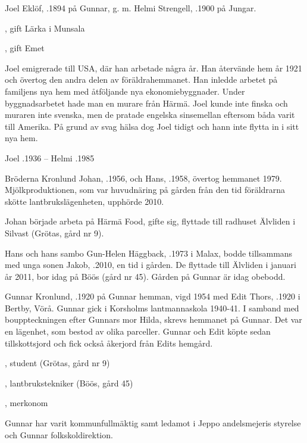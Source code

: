 Joel Eklöf, .1894 på Gunnar, g. m. Helmi Strengell, .1900 på Jungar.
\begin{jhchildren}
  \item {}, gift Lärka i Munsala
  \item {}
  \item {}, gift Emet
\end{jhchildren}
Joel emigrerade till USA, där han arbetade några år. Han återvände hem år 1921 och övertog den andra delen av föräldrahemmanet. Han inledde arbetet på familjens nya hem med åtföljande nya ekonomiebyggnader. Under byggnadsarbetet hade man en murare från Härmä. Joel kunde inte finska och muraren inte svenska, men de pratade engelska sinsemellan eftersom båda varit till Amerika. På grund av svag hälsa dog Joel tidigt och hann inte flytta in i sitt nya hem.

Joel .1936  --  Helmi .1985




Bröderna Kronlund Johan, .1956, och Hans, .1958, övertog hemmanet 1979. Mjölkproduktionen, som var huvudnäring på gården från den tid föräldrarna skötte lantbrukslägenheten, upphörde 2010.

Johan började arbeta på Härmä Food, gifte sig, flyttade till radhuset Älvliden i Silvast (Grötas, gård nr 9).


Hans och hans sambo Gun-Helen Häggback, .1973 i Malax, bodde tillsammans med unga sonen Jakob, .2010, en tid i gården. De flyttade till Älvliden i januari år 2011, bor idag på Böös (gård nr 45). Gården på Gunnar är idag obebodd.


Gunnar Kronlund, .1920 på Gunnar hemman, vigd 1954 med Edit Thors, .1920 i Bertby, Vörå. Gunnar gick i Korsholms lantmannaskola 1940-41. I samband med bouppteckningen efter Gunnars mor Hilda, skrevs hemmanet på Gunnar. Det var en lägenhet, som bestod av olika parceller. Gunnar och Edit köpte sedan tillskottsjord och fick också åkerjord från Edits hemgård.
\begin{jhchildren}
  \item {}, student (Grötas, gård nr 9)
  \item {}, lantbrukstekniker (Böös, gård 45)
  \item {}, merkonom
\end{jhchildren}
Gunnar har varit kommunfullmäktig samt ledamot i Jeppo andelsmejeris styrelse och Gunnar folkskoldirektion.

